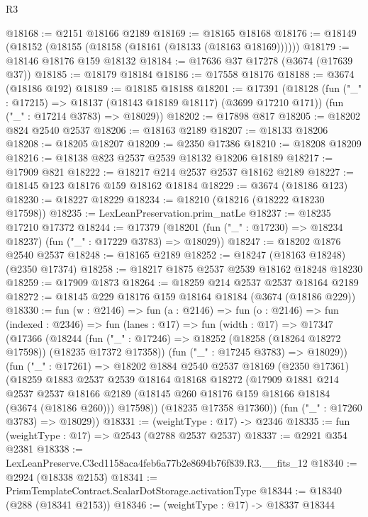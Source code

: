 \begin{lexlean}{R3}
\begin{coremodule}
@18168 := @2151 @18166 @2189
@18169 := @18165 @18168
@18176 := @18149 (@18152 (@18155 (@18158 (@18161 (@18133 (@18163 @18169))))))
@18179 := @18146 @18176 @159 @18132
@18184 := @17636 @37 @17278 (@3674 (@17639 @37))
@18185 := @18179 @18184
@18186 := @17558 @18176
@18188 := @3674 (@18186 @192)
@18189 := @18185 @18188
@18201 := @17391
    (@18128
      (fun ("_" : @17215) => @18137 (@18143 @18189 @18117) (@3699 @17210 @171))
      (fun ("_" : @17214 @3783) => @18029))
@18202 := @17898 @817
@18205 := @18202 @824 @2540 @2537
@18206 := @18163 @2189
@18207 := @18133 @18206
@18208 := @18205 @18207
@18209 := @2350 @17386
@18210 := @18208 @18209
@18216 := @18138 @823 @2537 @2539 @18132 @18206 @18189
@18217 := @17909 @821
@18222 := @18217 @214 @2537 @2537 @18162 @2189
@18227 := @18145 @123 @18176 @159 @18162 @18184
@18229 := @3674 (@18186 @123)
@18230 := @18227 @18229
@18234 := @18210 (@18216 (@18222 @18230 @17598))
@18235 := LexLeanPreservation.prim_natLe
@18237 := @18235 @17210 @17372
@18244 := @17379 (@18201 (fun ("_" : @17230) => @18234 @18237) (fun ("_" : @17229 @3783) => @18029))
@18247 := @18202 @1876 @2540 @2537
@18248 := @18165 @2189
@18252 := @18247 (@18163 @18248) (@2350 @17374)
@18258 := @18217 @1875 @2537 @2539 @18162 @18248 @18230
@18259 := @17909 @1873
@18264 := @18259 @214 @2537 @2537 @18164 @2189
@18272 := @18145 @229 @18176 @159 @18164 @18184 (@3674 (@18186 @229))
@18330 := fun (w : @2146) =>
  fun (a : @2146) =>
  fun (o : @2146) =>
  fun (indexed : @2346) =>
  fun (lanes : @17) =>
  fun (width : @17) =>
  @17347
    (@17366
      (@18244
        (fun ("_" : @17246) => @18252 (@18258 (@18264 @18272 @17598)) (@18235 @17372 @17358))
        (fun ("_" : @17245 @3783) => @18029))
      (fun ("_" : @17261) =>
      @18202
        @1884
        @2540
        @2537
        @18169
        (@2350 @17361)
        (@18259
          @1883
          @2537
          @2539
          @18164
          @18168
          @18272
          (@17909
            @1881
            @214
            @2537
            @2537
            @18166
            @2189
            (@18145 @260 @18176 @159 @18166 @18184 (@3674 (@18186 @260)))
            @17598))
        (@18235 @17358 @17360))
      (fun ("_" : @17260 @3783) => @18029))
@18331 := (weightType : @17) -> @2346
@18335 := fun (weightType : @17) => @2543 (@2788 @2537 @2537)
@18337 := @2921 @354 @2381
@18338 := LexLeanPreserve.C3cd1158aca4feb6a77b2e8694b76f839.R3.__fits_12
@18340 := @2924 (@18338 @2153)
@18341 := PrismTemplateContract.ScalarDotStorage.activationType
@18344 := @18340 (@288 (@18341 @2153))
@18346 := (weightType : @17) -> @18337 @18344

\end{coremodule}
\end{lexlean}
